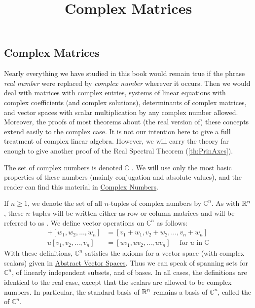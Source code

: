 \documentclass{ximera}
\title{Complex Matrices} \license{CC BY-NC-SA 4.0}
\begin{document}
\begin{abstract}
\end{abstract}
\maketitle

\begin{onlineOnly}
\section*{Complex Matrices}
\end{onlineOnly}

Nearly everything we have studied in this book would remain true if the phrase \textit{real number} were replaced by \textit{complex number}
 wherever it occurs. Then we would deal with matrices with complex
entries, systems of linear equations with complex coefficients (and
complex solutions), determinants of complex matrices, and vector spaces
with scalar multiplication by any complex number allowed. Moreover, the
proofs of most theorems about (the real version of) these concepts
extend easily to the complex case. It is not our intention here to give a
 full treatment of complex linear algebra. However, we will carry the
theory far enough to give another proof of the Real Spectral Theorem (\ref{th:PrinAxes}).

The set of complex numbers is denoted $\mathbb{C}$ . We will use only the most basic properties of these numbers (mainly conjugation and absolute values), and the reader can find this material in \href{https://ximera.osu.edu/oerlinalg/LinearAlgebra/APX-0020/main}{Complex Numbers}.

If $n \ge 1$, we denote the set of all $n$-tuples of complex numbers by $\mathbb{C}^n$. As with $\mathbb{R}^n$, these $n$-tuples will be written either as row or column matrices and will be referred to as . We define vector operations on $\mathbb{C}^n$ as follows:
\begin{align*}
[v_{1},  v_{2}, \ldots, v_{n}] + [w_{1}, w_{2}, \ldots, w_{n}] &= [v_{1} + w_{1}, v_{2} + w_{2}, \ldots, v_{n} + w_{n}] \\
u[v_{1}, v_{2}, \ldots, v_{n}] &= [uv_{1}, uv_{2}, \ldots, uv_{n}] \quad \mbox{ for } u \mbox{ in } \mathbb{C}
\end{align*}
With these definitions, $\mathbb{C}^n$ satisfies the axioms for a vector space (with complex scalars) given in \href{https://ximera.osu.edu/oerlinalg/LinearAlgebra/VSP-0050/main}{Abstract Vector Spaces}. Thus we can speak of spanning sets for $\mathbb{C}^n$, of linearly independent subsets, and of bases. In all cases, the definitions are identical to the real case, except that the scalars are allowed to be complex numbers. In particular, the standard basis of $\mathbb{R}^n$ remains a basis of $\mathbb{C}^n$, called the  of $\mathbb{C}^n$.
\end{document}
